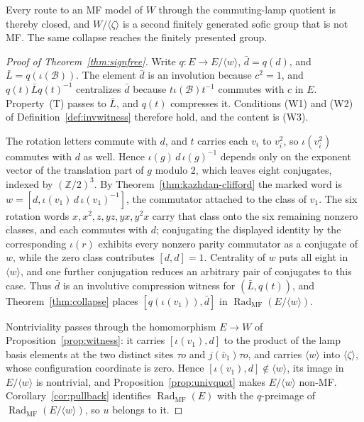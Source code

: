 \documentclass[11pt]{amsart}
\theoremstyle{definition}
\theoremstyle{remark}
\theoremstyle{plain}
\newcommand{\Z}{\mathbb Z}
\begin{document}
Every route to an MF model of $W$ through the commuting-lamp quotient
is thereby closed, and $W/\langle\zeta\rangle$ is a second finitely
generated sofic group that is not MF\@.  The same collapse reaches the
finitely presented group.

\begin{proof}[Proof of Theorem~\ref{thm:signfree}]
Write $q\colon E\to E/\langle w\rangle$, $\bar d=q(d)$, and
$\bar L=q(\iota(\mathcal B))$.  The element $\bar d$ is an involution
because $c^2=1$, and $q(t)\bar Lq(t)^{-1}$ centralizes $\bar d$
because $t\iota(\mathcal B)t^{-1}$ commutes with $c$ in $E$.
Property~\textup{(T)} passes to $\bar L$, and $q(t)$ compresses it.
Conditions (W1) and (W2) of Definition~\ref{def:invwitness} therefore
hold, and the content is (W3).

The rotation letters commute with $d$, and $t$ carries each $v_i$ to
$v_i^2$, so $\iota(v_i^2)$ commutes with $d$ as well.  Hence
$\iota(g)\,d\,\iota(g)^{-1}$ depends only on the exponent vector of
the translation part of $g$ modulo $2$, which leaves eight conjugates,
indexed by $(\Z/2)^3$.  By Theorem~\ref{thm:kazhdan-clifford} the
marked word is $w=[d,\iota(v_1)\,d\,\iota(v_1)^{-1}]$, the commutator
attached to the class of $v_1$.  The six rotation words
$x,x^2,z,yz,yx,y^2x$ carry that class onto the six remaining nonzero
classes, and each commutes with $d$; conjugating the displayed
identity by the corresponding $\iota(r)$ exhibits every nonzero parity
commutator as a conjugate of $w$, while the zero class contributes
$[d,d]=1$.  Centrality of $w$ puts all eight in $\langle w\rangle$,
and one further conjugation reduces an arbitrary pair of conjugates to
this case.  Thus $\bar d$ is an involutive compression witness for
$(\bar L,q(t))$, and Theorem~\ref{thm:collapse} places
$[q(\iota(v_1)),\bar d]$ in
$\operatorname{Rad}_{\mathrm{MF}}(E/\langle w\rangle)$.

Nontriviality passes through the homomorphism $E\to W$ of
Proposition~\ref{prop:witness}: it carries $[\iota(v_1),d]$ to the
product of the lamp basis elements at the two distinct sites $\tau o$
and $j(\bar v_1)\tau o$, and carries $\langle w\rangle$ into
$\langle\zeta\rangle$, whose configuration coordinate is zero.  Hence
$[\iota(v_1),d]\notin\langle w\rangle$, its image in
$E/\langle w\rangle$ is nontrivial, and
Proposition~\ref{prop:univquot} makes $E/\langle w\rangle$ non-MF\@.
Corollary~\ref{cor:pullback} identifies
$\operatorname{Rad}_{\mathrm{MF}}(E)$ with the $q$-preimage of
$\operatorname{Rad}_{\mathrm{MF}}(E/\langle w\rangle)$, so $u$ belongs
to it.
\end{proof}
\end{document}
